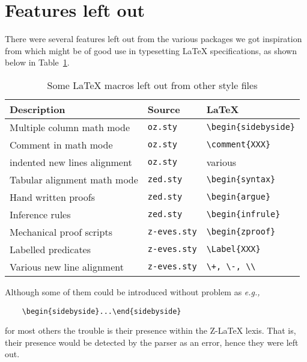 \documentclass{article}
\begin{document}
\section{Features left out}\label{sec:todo}

There were several features left out from the various packages we got
inspiration from which might be of good use in typesetting \LaTeX{}
specifications, as shown below in Table~\ref{tbl:todo}.
%
\begin{table}[ht]
\centering
\begin{tabular}{|l|l|l|}
    \hline
    \textbf{Description}      & \textbf{Source}               & \textbf{\LaTeX} \\
    \hline
    Multiple column math mode & \texttt{oz.sty}              & \verb|\begin{sidebyside}|      \\
    \hline
    Comment in math mode      & \texttt{oz.sty}              & \verb|\comment{XXX}|           \\
    \hline
    indented new lines alignment  & \texttt{oz.sty}              & various \\
    \hline
    Tabular alignment math mode & \texttt{zed.sty}               & \verb|\begin{syntax}|         \\
    \hline
    Hand written proofs         & \texttt{zed.sty}       & \verb|\begin{argue}|        \\
    \hline
    Inference rules         & \texttt{zed.sty}              & \verb|\begin{infrule}|     \\
    \hline
    Mechanical proof scripts & \texttt{z-eves.sty}      & \verb|\begin{zproof}|  \\
    \hline
    Labelled predicates      & \texttt{z-eves.sty}      & \verb|\Label{XXX}|  \\
    \hline
    Various new line alignment & \texttt{z-eves.sty}   & \verb|\+, \-, \\| \\
    \hline
\end{tabular}
\caption{Some \LaTeX{} macros left out from other style files}\label{tbl:todo}
\end{table}
\newpage %
%
Although some of them could be introduced without problem as \textit{e.g.,}
\begin{verbatim}
    \begin{sidebyside}...\end{sidebyside}
\end{verbatim}
for most others the trouble is their presence within the Z-\LaTeX{} lexis.
That is, their presence would be detected by the parser as an error, hence they were left out.
\end{document}
